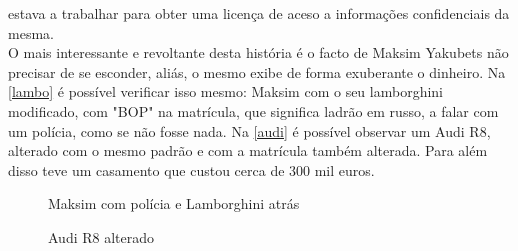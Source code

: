 \documentclass{report}
\begin{document}
estava a trabalhar para obter uma licença de aceso a informações confidenciais da mesma.\\ \indent O mais interessante e revoltante desta história é o facto de Maksim Yakubets não precisar de se esconder, aliás, o mesmo exibe de forma exuberante o dinheiro. Na \autoref{lambo} é possível verificar isso mesmo: Maksim com o seu lamborghini modificado, com "BOP" na matrícula, que significa ladrão em russo, a falar com um polícia, como se não fosse nada. Na \autoref{audi} é possível observar um Audi R8, alterado com o mesmo padrão e com a matrícula também alterada. Para além disso teve um casamento que custou cerca de 300 mil euros.
\begin{figure}[h]
\begin{minipage}{0.50\textwidth}
    \center
    \caption{Maksim com polícia e Lamborghini atrás}
    \label{lambo}
\end{minipage}
\begin{minipage}{0.50\textwidth}
    \center	
    \caption{Audi R8 alterado}
    \label{audi}
\end{minipage}
\end{figure}
\end{document}
